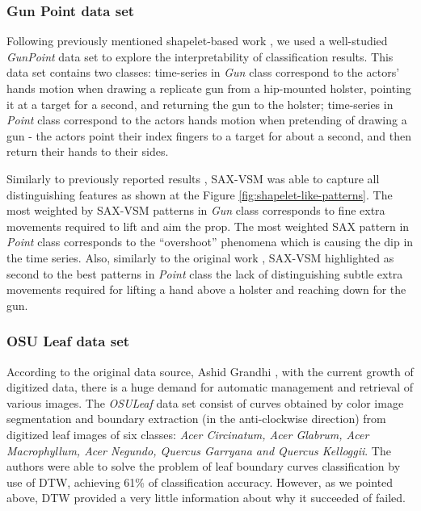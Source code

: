 \subsubsection{Gun Point data set}
Following previously mentioned shapelet-based work \cite{citeulike:7344347, citeulike:11345338}, 
we used a well-studied \textit{GunPoint} data set \cite{DBLP:conf/sdm/RatanamahatanaK04} to explore the 
interpretability of classification results. This data set contains two classes: 
time-series in \textit{Gun} class correspond to the actors' hands motion when drawing
a replicate gun from a hip-mounted holster, pointing it at a target for a second,
and returning the gun to the holster; 
time-series in \textit{Point} class correspond to the actors hands motion when pretending
of drawing a gun - the actors point their index fingers to a target for about a second, 
and then return their hands to their sides. 

Similarly to previously reported results \cite{citeulike:7344347, citeulike:11345338}, 
SAX-VSM was able to capture all distinguishing features as shown at the 
Figure \ref{fig:shapelet-like-patterns}. The most weighted by SAX-VSM patterns in 
\textit{Gun} class corresponds to fine extra movements required to lift and aim the prop. 
The most weighted SAX pattern in \textit{Point} class corresponds to the ``overshoot''
phenomena which is causing the dip in the time series. 
Also, similarly to the original work \cite{DBLP:conf/sdm/RatanamahatanaK04}, SAX-VSM highlighted as second to the best
patterns in \textit{Point} class the lack of distinguishing subtle extra movements required
for lifting a hand above a holster and reaching down for the gun.

\subsubsection{OSU Leaf data set}
According to the original data source, Ashid Grandhi \cite{citeulike:12563798}, with the current growth of
digitized data, there is a huge demand for automatic management and retrieval of various images. The
\textit{OSULeaf} data set consist of curves obtained by color image segmentation and boundary
extraction (in the anti-clockwise direction) from digitized leaf images of six classes: \textit{Acer
Circinatum, Acer Glabrum, Acer Macrophyllum, Acer Negundo, Quercus Garryana and Quercus Kelloggii}.
The authors were able to solve the problem of leaf boundary curves classification by use of DTW, 
achieving 61\% of classification accuracy. However, as we pointed above, DTW provided a
very little information about why it succeeded of failed. 

